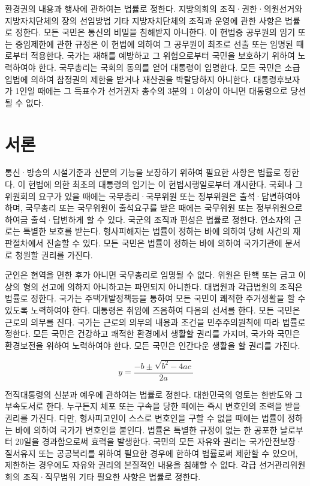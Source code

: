\documentclass[master, korean]{pnuthesis}
\begin{document}
환경권의 내용과 행사에 관하여는 법률로 정한다. 지방의회의 조직·권한·의원선거와 지방자치단체의 장의 선임방법 기타 지방자치단체의 조직과 운영에 관한 사항은 법률로 정한다. 모든 국민은 통신의 비밀을 침해받지 아니한다. 이 헌법중 공무원의 임기 또는 중임제한에 관한 규정은 이 헌법에 의하여 그 공무원이 최초로 선출 또는 임명된 때로부터 적용한다. 국가는 재해를 예방하고 그 위험으로부터 국민을 보호하기 위하여 노력하여야 한다. 국무총리는 국회의 동의를 얻어 대통령이 임명한다. 모든 국민은 소급입법에 의하여 참정권의 제한을 받거나 재산권을 박탈당하지 아니한다. 대통령후보자가 1인일 때에는 그 득표수가 선거권자 총수의 3분의 1 이상이 아니면 대통령으로 당선될 수 없다.

\section{서론}

통신·방송의 시설기준과 신문의 기능을 보장하기 위하여 필요한 사항은 법률로 정한다. 이 헌법에 의한 최초의 대통령의 임기는 이 헌법시행일로부터 개시한다. 국회나 그 위원회의 요구가 있을 때에는 국무총리·국무위원 또는 정부위원은 출석·답변하여야 하며, 국무총리 또는 국무위원이 출석요구를 받은 때에는 국무위원 또는 정부위원으로 하여금 출석·답변하게 할 수 있다. 국군의 조직과 편성은 법률로 정한다. 연소자의 근로는 특별한 보호를 받는다. 형사피해자는 법률이 정하는 바에 의하여 당해 사건의 재판절차에서 진술할 수 있다. 모든 국민은 법률이 정하는 바에 의하여 국가기관에 문서로 청원할 권리를 가진다.

군인은 현역을 면한 후가 아니면 국무총리로 임명될 수 없다. 위원은 탄핵 또는 금고 이상의 형의 선고에 의하지 아니하고는 파면되지 아니한다. 대법원과 각급법원의 조직은 법률로 정한다. 국가는 주택개발정책등을 통하여 모든 국민이 쾌적한 주거생활을 할 수 있도록 노력하여야 한다. 대통령은 취임에 즈음하여 다음의 선서를 한다. 모든 국민은 근로의 의무를 진다. 국가는 근로의 의무의 내용과 조건을 민주주의원칙에 따라 법률로 정한다. 모든 국민은 건강하고 쾌적한 환경에서 생활할 권리를 가지며, 국가와 국민은 환경보전을 위하여 노력하여야 한다. 모든 국민은 인간다운 생활을 할 권리를 가진다.

\begin{equation}
	y = \frac{-b \pm \sqrt{b^2-4ac}}{2a}
\end{equation}

전직대통령의 신분과 예우에 관하여는 법률로 정한다. 대한민국의 영토는 한반도와 그 부속도서로 한다. 누구든지 체포 또는 구속을 당한 때에는 즉시 변호인의 조력을 받을 권리를 가진다. 다만, 형사피고인이 스스로 변호인을 구할 수 없을 때에는 법률이 정하는 바에 의하여 국가가 변호인을 붙인다. 법률은 특별한 규정이 없는 한 공포한 날로부터 20일을 경과함으로써 효력을 발생한다. 국민의 모든 자유와 권리는 국가안전보장·질서유지 또는 공공복리를 위하여 필요한 경우에 한하여 법률로써 제한할 수 있으며, 제한하는 경우에도 자유와 권리의 본질적인 내용을 침해할 수 없다. 각급 선거관리위원회의 조직·직무범위 기타 필요한 사항은 법률로 정한다.
\end{document}
